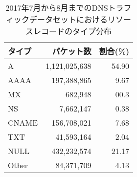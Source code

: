 \begin{table}[h]
 \caption[リソースレコードの分布]{2017年7月から8月までのDNSトラフィックデータセットにおけるリソースレコードのタイプ分布}
 \centering
  \begin{tabular}{lrr}
    \toprule
    \textbf{タイプ} & \textbf{パケット数} & \textbf{割合(\%)}\\
    \midrule
    A & 1,121,025,638 & 54.90\\
    AAAA & 197,388,865 & 9.67\\
    MX & 682,948 & 00.3\\
    NS & 7,662,147 & 0.38 \\
    CNAME & 156,708,021 & 7.68 \\
    TXT & 41,593,164 & 2.04 \\
    NULL & 432,232,574 & 21.17 \\
    Other & 84,371,709 & 4.13 \\
    \bottomrule
  \end{tabular}
 \label{tab:infil-rtype}
\end{table}
